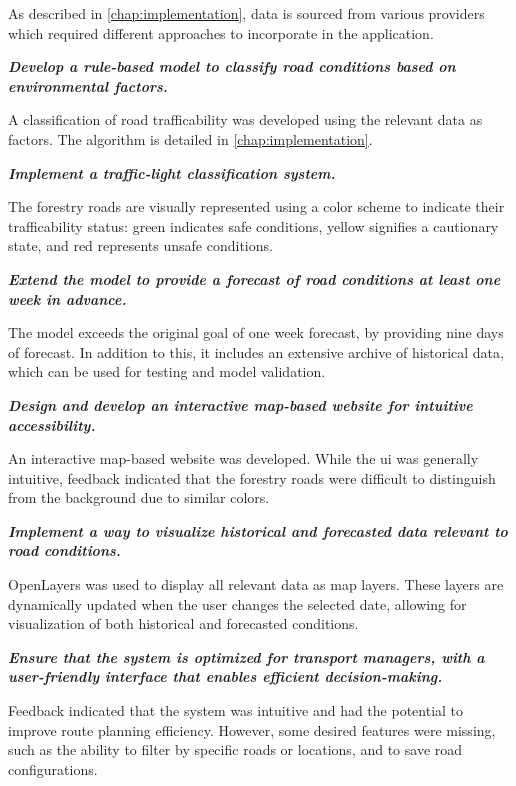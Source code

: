 \textbf{} 

As described in \autoref{chap:implementation}, data is sourced from various providers which required different approaches to incorporate in the application. 

\textbf{\textit{Develop a rule-based model to classify road conditions based on environmental factors.}}

A classification of road trafficability was developed using the relevant data as factors. The algorithm is detailed in \autoref{chap:implementation}.

\textbf{\textit{Implement a traffic-light classification system.}}

The forestry roads are visually represented using a color scheme to indicate their trafficability status: green indicates safe conditions, yellow signifies a cautionary state, and red represents unsafe conditions.

\textbf{\textit{Extend the model to provide a forecast of road conditions at least one week in advance.}}

The model exceeds the original goal of one week forecast, by providing nine days of forecast. In addition to this, it includes an extensive archive of historical data, which can be used for testing and model validation.

\textbf{\textit{Design and develop an interactive map-based website for intuitive accessibility.}}

An interactive map-based website was developed. While the \acrshort{ui} was generally intuitive, feedback indicated that the forestry roads were difficult to distinguish from the background due to similar colors.  

\textbf{\textit{Implement a way to visualize historical and forecasted data relevant to road conditions.}}

OpenLayers was used to display all relevant data as map layers. These layers are dynamically updated when the user changes the selected date, allowing for visualization of both historical and forecasted conditions.

\textbf{\textit{Ensure that the system is optimized for transport managers, with a user-friendly interface that enables efficient decision-making.}}

Feedback indicated that the system was intuitive and had the potential to improve route planning efficiency. However, some desired features were missing, such as the ability to filter by specific roads or locations, and to save road configurations.

